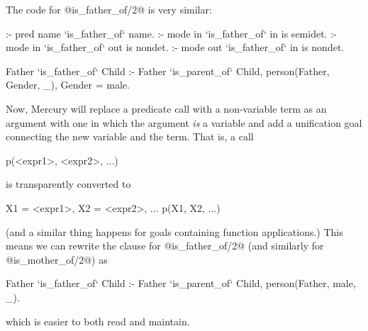 The code for @is_father_of/2@ is very similar:
\begin{myverbatim}
:- pred name `is_father_of` name.
:- mode in   `is_father_of` in  is semidet.
:- mode in   `is_father_of` out is nondet.
:- mode out  `is_father_of` in  is nondet.

Father `is_father_of` Child :-
    Father `is_parent_of` Child,
    person(Father, Gender, _),
    Gender = male.
\end{myverbatim}
Now, Mercury will replace a predicate call with a non-variable term as an
argument with one in which the argument \emph{is} a variable and add a
unification goal connecting the new variable and the term.  That is, a call
\begin{myverbatim}
    p(<expr1>, <expr2>, ...)
\end{myverbatim}
is transparently converted to
\begin{myverbatim}
    X1 = <expr1>,
    X2 = <expr2>,
    ...
    p(X1, X2, ...)
\end{myverbatim}
(and a similar thing happens for goals containing function applications.)
This means we can rewrite the clause for @is_father_of/2@ (and similarly for
@is_mother_of/2@) as
\begin{myverbatim}
Father `is_father_of` Child :-
    Father `is_parent_of` Child,
    person(Father, male, _).
\end{myverbatim}
which is easier to both read and maintain.

